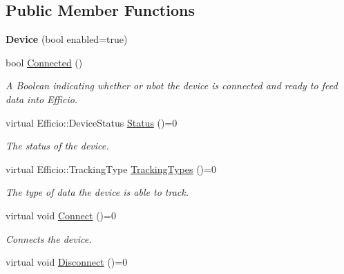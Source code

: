 \subsection*{Public Member Functions}
\begin{DoxyCompactItemize}
\item 
{\bfseries Device} (bool enabled=true)\hypertarget{class_efficio_1_1_device_a03b5d83501b593eced3d011954ca265f}{}\label{class_efficio_1_1_device_a03b5d83501b593eced3d011954ca265f}

\item 
bool \hyperlink{class_efficio_1_1_device_a51228fd0878a8514a28844a934a95625}{Connected} ()\hypertarget{class_efficio_1_1_device_a51228fd0878a8514a28844a934a95625}{}\label{class_efficio_1_1_device_a51228fd0878a8514a28844a934a95625}

\begin{DoxyCompactList}\small\item\em A Boolean indicating whether or nbot the device is connected and ready to feed data into Efficio. \end{DoxyCompactList}\item 
virtual Efficio\+::\+Device\+Status \hyperlink{class_efficio_1_1_device_a4fc83f754676de245976e1d1bb08b392}{Status} ()=0\hypertarget{class_efficio_1_1_device_a4fc83f754676de245976e1d1bb08b392}{}\label{class_efficio_1_1_device_a4fc83f754676de245976e1d1bb08b392}

\begin{DoxyCompactList}\small\item\em The status of the device. \end{DoxyCompactList}\item 
virtual Efficio\+::\+Tracking\+Type \hyperlink{class_efficio_1_1_device_ab655d0b6f140954de99fc4f187aca261}{Tracking\+Types} ()=0\hypertarget{class_efficio_1_1_device_ab655d0b6f140954de99fc4f187aca261}{}\label{class_efficio_1_1_device_ab655d0b6f140954de99fc4f187aca261}

\begin{DoxyCompactList}\small\item\em The type of data the device is able to track. \end{DoxyCompactList}\item 
virtual void \hyperlink{class_efficio_1_1_device_a852ea0bc779e5ec543b2a1162986ef7c}{Connect} ()=0\hypertarget{class_efficio_1_1_device_a852ea0bc779e5ec543b2a1162986ef7c}{}\label{class_efficio_1_1_device_a852ea0bc779e5ec543b2a1162986ef7c}

\begin{DoxyCompactList}\small\item\em Connects the device. \end{DoxyCompactList}\item 
virtual void \hyperlink{class_efficio_1_1_device_a8fb17a0b95255e8947cca9dcddcff26c}{Disconnect} ()=0\hypertarget{class_efficio_1_1_device_a8fb17a0b95255e8947cca9dcddcff26c}{}\label{class_efficio_1_1_device_a8fb17a0b95255e8947cca9dcddcff26c}


\end{DoxyCompactItemize}
